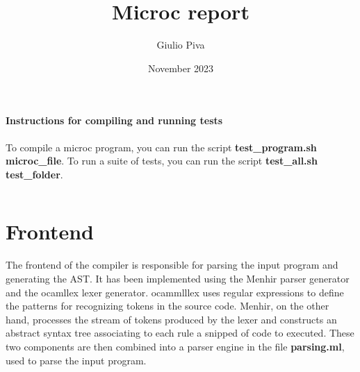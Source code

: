 \documentclass{article}
\title{Microc report}
\author{Giulio Piva}
\date{November 2023}
\begin{document}
\maketitle

\paragraph{Instructions for compiling and running tests}
To compile a microc program, you can run the script \textbf{test\_program.sh microc\_file}.
To run a suite of tests, you can run the script \textbf{test\_all.sh test\_folder}.

\begin{lstlisting}

\end{lstlisting}
\section{Frontend}
The frontend of the compiler is responsible for parsing the input program and generating the AST.
It has been implemented using the Menhir parser generator and the ocamllex lexer generator.
ocammlllex uses regular expressions to define the patterns for recognizing tokens in the source code.
Menhir, on the other hand, processes the stream of tokens produced by the lexer and
constructs an abstract syntax tree associating to each rule a snipped of code to executed.
These two components are then combined into a parser engine in the file \textbf{parsing.ml}, used to parse the input program.
\end{document}
